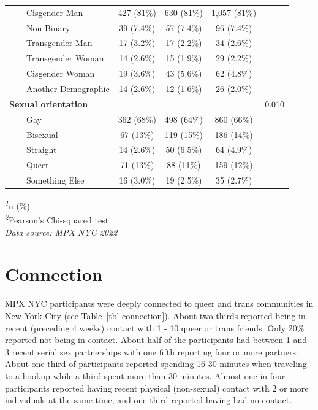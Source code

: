 \documentclass[
  letterpaper,
  DIV=11,
  numbers=noendperiod,
  oneside]{scrreprt}
\begin{document}
\begin{longtable}{lcccc}
    Cisgender Man & 427 (81\%) & 630 (81\%) & 1,057 (81\%) &  \\ 
    Non Binary & 39 (7.4\%) & 57 (7.4\%) & 96 (7.4\%) &  \\ 
    Transgender Man & 17 (3.2\%) & 17 (2.2\%) & 34 (2.6\%) &  \\ 
    Transgender Woman & 14 (2.6\%) & 15 (1.9\%) & 29 (2.2\%) &  \\ 
    Cisgender Woman & 19 (3.6\%) & 43 (5.6\%) & 62 (4.8\%) &  \\ 
    Another Demographic & 14 (2.6\%) & 12 (1.6\%) & 26 (2.0\%) &  \\ 
\textbf{Sexual orientation} &  &  &  & 0.010 \\ 
    Gay & 362 (68\%) & 498 (64\%) & 860 (66\%) &  \\ 
    Bisexual & 67 (13\%) & 119 (15\%) & 186 (14\%) &  \\ 
    Straight & 14 (2.6\%) & 50 (6.5\%) & 64 (4.9\%) &  \\ 
    Queer & 71 (13\%) & 88 (11\%) & 159 (12\%) &  \\ 
    Something Else & 16 (3.0\%) & 19 (2.5\%) & 35 (2.7\%) &  \\ 
\bottomrule
\end{longtable}
\begin{minipage}{\linewidth}
\textsuperscript{\textit{1}}n (\%)\\
\textsuperscript{\textit{2}}Pearson's Chi-squared test\\
\emph{Data source: MPX NYC 2022}\\
\end{minipage}

\hypertarget{connection}{%
\section{Connection}\label{connection}}

MPX NYC participants were deeply connected to queer and trans
communities in New York City (see Table~\ref{tbl-connection}). About
two-thirds reported being in recent (preceding 4 weeks) contact with 1 -
10 queer or trans friends. Only 20\% reported not being in contact.
About half of the participants had between 1 and 3 recent serial sex
partnerships with one fifth reporting four or more partners. About one
third of participants reported spending 16-30 minutes when traveling to
a hookup while a third spent more than 30 minutes. Almost one in four
participants reported having recent physical (non-sexual) contact with 2
or more individuals at the same time, and one third reported having had
no contact.
\end{document}
